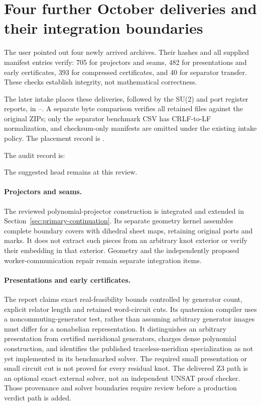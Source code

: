 \section{Four further October deliveries and their integration boundaries}
\label{sec:incoming-four}

The user pointed out four newly arrived 
archives. Their hashes and all supplied manifest entries verify: 705 for
projectors and seams, 482 for presentations and early certificates, 393 for
compressed certificates, and 40 for separator transfer. These checks establish
integrity, not mathematical correctness.

The later intake places these deliveries, followed by the SU(2) and port
register reports, in --. A separate
byte comparison verifies all retained files against the original ZIPs;
only the separator benchmark CSV has CRLF-to-LF normalization, and
checksum-only manifests are omitted under the existing intake policy.
The placement record is .

The audit record is:
\begin{center}\small
{}
\end{center}
The suggested
 head remains  at this review.

\paragraph{Projectors and seams.}
The reviewed polynomial-projector construction is integrated and extended in
Section~\ref{sec:primary-continuation}. Its separate geometry kernel assembles
complete boundary covers with dihedral sheet maps, retaining original ports
and marks. It does not extract such pieces from an arbitrary knot exterior
or verify their embedding in that exterior. Geometry and the independently
proposed worker-communication repair remain separate integration items.

\paragraph{Presentations and early certificates.}
The report claims exact real-feasibility bounds controlled by generator count,
explicit relator length and retained word-circuit cuts. Its quaternion compiler
uses a noncommuting-generator test, rather than assuming arbitrary generator
images must differ for a nonabelian representation. It distinguishes an
arbitrary presentation from certified meridional generators, charges dense
polynomial construction, and identifies the published traceless-meridian
specialization as not yet implemented in its benchmarked solver. The required
small presentation or small circuit cut is not proved for every residual knot.
The delivered Z3 path is an optional exact external solver, not an independent
UNSAT proof checker. Those provenance and solver boundaries require review
before a production verdict path is added.

